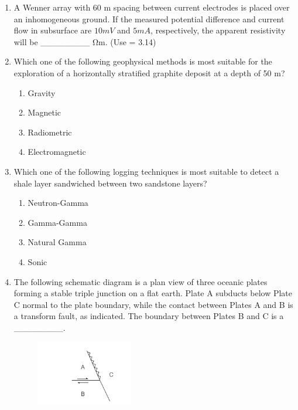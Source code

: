 \documentclass[journal,12pt,onecolumn]{IEEEtran}
\begin{document}
\begin{enumerate}
\begin{enumerate}
\item A Wenner array with 60 m spacing between current electrodes is placed over an inhomogeneous ground. If the measured potential difference and current flow in subsurface are $10 mV$ and $5 mA$, respectively, the apparent resistivity will be \_\_\_\_\_\_\_\_ Ωm. (Use \pi = 3.14)

\hfill{}

\item Which one of the following geophysical methods is most suitable for the exploration of a horizontally stratified graphite deposit at a depth of 50 m?

\hfill{}

\begin{multicols}{4}
\begin{enumerate}
\item Gravity
\item Magnetic
\item Radiometric
\item Electromagnetic
\end{enumerate}
\end{multicols}

\item Which one of the following logging techniques is most suitable to detect a shale layer sandwiched between two sandstone layers?

\hfill{}

\begin{multicols}{4}
\begin{enumerate}
\item Neutron-Gamma
\item Gamma-Gamma
\item Natural Gamma
\item Sonic
\end{enumerate}
\end{multicols}

\item The following schematic diagram is a plan view of three oceanic plates forming a stable triple junction on a flat earth. Plate A subducts below Plate C normal to the plate boundary, while the contact between Plates A and B is a transform fault, as indicated. The boundary between Plates B and C is a \_\_\_\_\_\_\_\_.

\hfill{}

\begin{figure}[h!]
    \centering
    \includegraphics[width=0.4\textwidth]{figs/fig5.png}
    \caption{}
    \label{fig:q18}
\end{figure}






\end{enumerate}
\end{enumerate}
\end{document}
